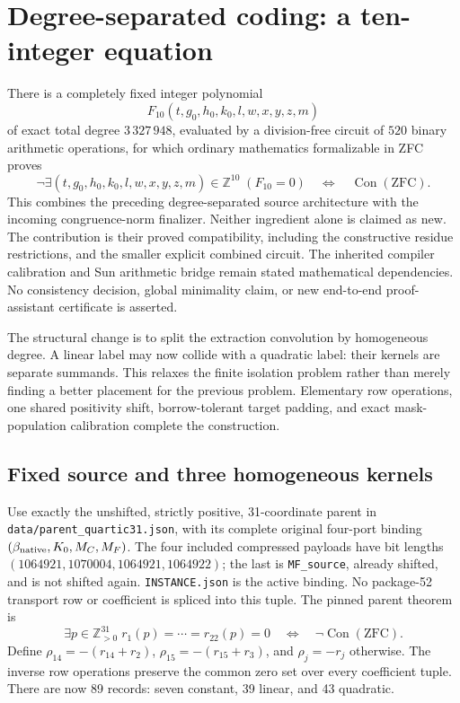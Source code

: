 \section{Degree-separated coding: a ten-integer equation}
\label{sec:wave9-signed}

There is a completely fixed integer polynomial
\[
 F_{10}(t,g_0,h_0,k_0,l,w,x,y,z,m)
\]
of exact total degree $3\,327\,948$, evaluated by a division-free circuit of
$520$ binary arithmetic operations, for which ordinary mathematics
formalizable in ZFC proves
\[
 \neg\exists(t,g_0,h_0,k_0,l,w,x,y,z,m)\in\mathbb Z^{10}\;(F_{10}=0)
 \quad\Longleftrightarrow\quad\operatorname{Con}(\mathrm{ZFC}).
\]
This combines the preceding degree-separated source architecture with the incoming congruence-norm finalizer. Neither ingredient alone is claimed as new. The contribution is their proved compatibility, including the constructive residue restrictions, and the smaller explicit combined circuit.
The inherited compiler calibration and Sun arithmetic bridge remain stated
mathematical dependencies. No consistency decision, global minimality claim,
or new end-to-end proof-assistant certificate is asserted.

The structural change is to split the extraction convolution by homogeneous
degree. A linear label may now collide with a quadratic label: their kernels
are separate summands. This relaxes the finite isolation problem rather than
merely finding a better placement for the previous problem. Elementary row
operations, one shared positivity shift, borrow-tolerant target padding,
and exact mask-population calibration complete the construction.

\subsection{Fixed source and three homogeneous kernels}

Use exactly the unshifted, strictly positive, 31-coordinate parent in
\texttt{data/parent\_quartic31.json}, with its complete original four-port
binding $(\beta_{\rm native},K_0,M_C,M_F)$. The four included compressed
payloads have bit lengths $(1064921,1070004,1064921,1064922)$; the last is
\texttt{MF\_source}, already shifted, and is not shifted again.
\texttt{INSTANCE.json} is the active binding. No package-52 transport row or
coefficient is spliced into this tuple. The pinned parent theorem is
\[
 \exists p\in\mathbb Z_{>0}^{31}\;r_1(p)=\cdots=r_{22}(p)=0
 \quad\Longleftrightarrow\quad\neg\operatorname{Con}(\mathrm{ZFC}).
\]
Define $\rho_{14}=-(r_{14}+r_2)$, $\rho_{15}=-(r_{15}+r_3)$, and $\rho_j=-r_j$ otherwise. The inverse row
operations preserve the common zero set over every coefficient tuple.
There are now 89 records: seven constant, 39 linear, and 43 quadratic.

